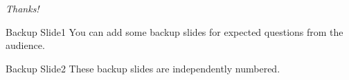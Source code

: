 \documentclass{beamer}
\begin{document}
	\section*{} 
	\begin{frame}{}
		\centering \Huge
		\emph{Thanks!}
	\end{frame}

	\appendix
	\begin{frame}{Backup Slide1}
		You can add some backup slides for expected questions from the audience.
	\end{frame}

	\begin{frame}{Backup Slide2}
		These backup slides are independently numbered.
	\end{frame}
	
\end{document}
